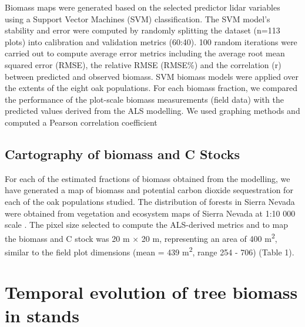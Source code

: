 Biomass maps were generated based on the selected predictor lidar variables using a Support Vector Machines (SVM) classification. The SVM model’s stability and error were computed by randomly splitting the dataset (n=113 plots) into calibration and validation metrics (60:40). 100 random iterations were carried out to compute average error metrics including the average root mean squared error (RMSE), the relative RMSE (RMSE\%) and the correlation (r) between predicted and observed biomass. SVM biomass models were applied over the extents of the eight oak populations. 
For each biomass fraction, we compared the performance of the plot-scale biomass measurements (field data) with the predicted values derived from the ALS modelling. We used graphing methods and computed a Pearson correlation coefficient


\subsection{Cartography of biomass and C Stocks}\label{sec:carbon:mat-cmpas}
For each of the estimated fractions of biomass obtained from the modelling, we have generated a map of biomass and potential carbon dioxide sequestration for each of the oak populations studied. The distribution of \Qp forests in Sierra Nevada were obtained from vegetation and ecosystem maps of Sierra Nevada at 1:10 000 scale \autocite{CMAOT2014CartografiaEvaluacion,PerezLuqueetal2019MapEcosystems}. The pixel size selected to compute the ALS-derived metrics and to map the biomass and C stock was 20 m × 20 m, representing an area of 400 m\textsuperscript{2}, similar to the field plot dimensions (mean = 439 m\textsuperscript{2}, range 254 - 706) (Table 1).

\section{Temporal evolution of tree biomass in \Qp stands}\label{sec:carbon:mat-temporal}

